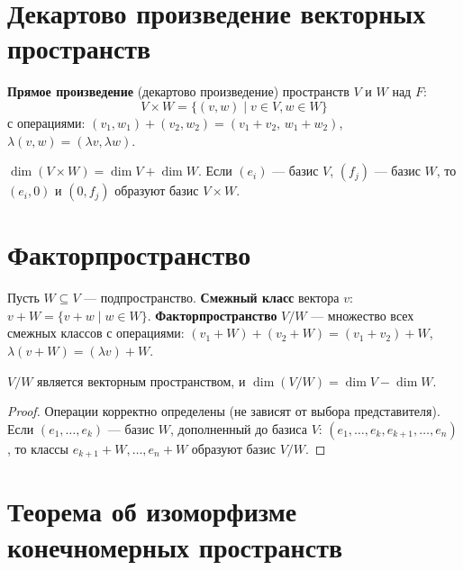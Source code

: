 \documentclass[12pt]{article}
\begin{document}
\section{Декартово произведение векторных пространств}

\begin{definition}
\textbf{Прямое произведение} (декартово произведение) пространств
$V$ и $W$ над $F$:
\[
V \times W = \{(v, w) \mid v \in V, w \in W\}
\]
с операциями:
$(v_1,w_1)+(v_2,w_2) = (v_1+v_2,\, w_1+w_2)$,
$\lambda(v,w) = (\lambda v, \lambda w)$.
\end{definition}

\begin{property}
$\dim(V \times W) = \dim V + \dim W$.
Если $(e_i)$ --- базис $V$, $(f_j)$ --- базис $W$, то
$(e_i,0)$ и $(0,f_j)$ образуют базис $V \times W$.
\end{property}

\section{Факторпространство}

\begin{definition}
Пусть $W \subseteq V$ --- подпространство.
\textbf{Смежный класс} вектора $v$: $v + W = \{v + w \mid w \in W\}$.
\textbf{Факторпространство} $V/W$ --- множество всех смежных классов
с операциями:
$(v_1+W) + (v_2+W) = (v_1+v_2)+W$,
$\lambda(v+W) = (\lambda v)+W$.
\end{definition}

\begin{theorem}
$V/W$ является векторным пространством, и $\dim(V/W) = \dim V - \dim W$.
\end{theorem}

\begin{proof}
Операции корректно определены (не зависят от выбора представителя).
Если $(e_1,\ldots,e_k)$ --- базис $W$, дополненный до базиса $V$:
$(e_1,\ldots,e_k,e_{k+1},\ldots,e_n)$, то классы
$e_{k+1}+W,\ldots,e_n+W$ образуют базис $V/W$.
\end{proof}

\section{Теорема об изоморфизме конечномерных пространств}
\end{document}
